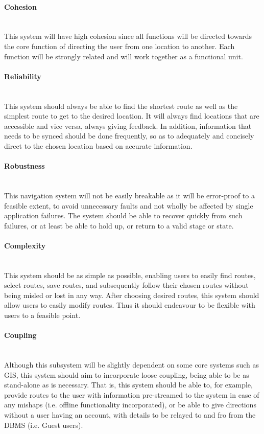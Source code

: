 	\paragraph{Cohesion}
	\mbox{}\\
	This system will have high cohesion since all functions will be directed towards the core
	 function of directing the user from one location to another. Each function will be
	  strongly related and will work together as a functional unit.

	\paragraph{Reliability}
	\mbox{}\\
	This system should always be able to find the shortest route as well as the simplest route
	to get to the desired location. It will always find locations that are accessible and vice
	versa, always giving feedback. In addition, information that needs to be synced should be done
	frequently, so as to adequately and concisely direct to the chosen location based on accurate
	information.

	\paragraph{Robustness}
	\mbox{}\\
	This navigation system will not be easily breakable as it will be error-proof to a feasible
	extent, to avoid unnecessary faults and not wholly be affected by single application failures.
	The system should be able to recover quickly from such failures, or at least be able to
	hold up, or return to a valid stage or state.

	\paragraph{Complexity}
	\mbox{}\\
	This system should be as simple as possible, enabling users to easily find routes, select routes,
	save routes, and subsequently follow their chosen routes without being misled or lost in any way.
	After choosing desired routes, this system should allow users to easily modify routes. Thus it should
	endeavour to be flexible with users to a feasible point.

	\paragraph{Coupling}
	\mbox{}\\
	Although this subsystem will be slightly dependent on some core systems such as GIS, this system
	should aim to incorporate loose coupling, being able to be as stand-alone as is necessary.
	That is, this system should be able to, for example, provide routes to the user with information
	pre-streamed to the system in case of any mishaps (i.e. offline functionality incorporated),
	or be able to give directions without a user having an account, with details to be relayed to and
	fro from the DBMS (i.e. Guest users).




